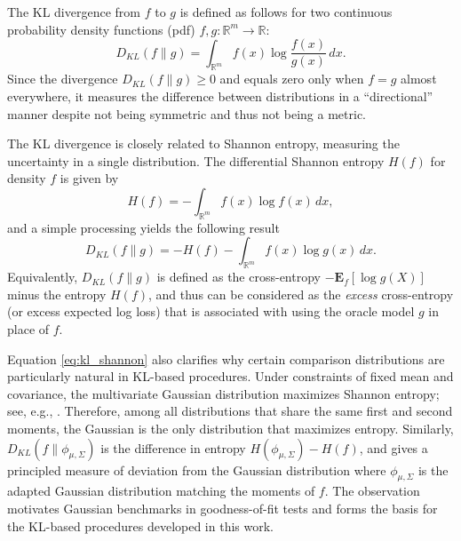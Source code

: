 \documentclass[12pt,a4paper]{article}
\newcommand{\E}{\mathbf {E}}
\theoremstyle{definition}
\theoremstyle{plain}
\begin{document}
The KL divergence from $f$ to $g$ is defined as follows for two continuous probability density functions (pdf) $f,g:\mathbb{R}^m \to
\mathbb{R}$:
\begin{equation}\label{eq:kl_divergence}
D_{KL}(f \| g) = \int_{\mathbb{R}^m} f(x) \log \frac{f(x)}{g(x)}\,dx.
\end{equation}
 Since the divergence $D_{KL}(f \| g)\geq 0$ and equals zero only when $f = g$ almost everywhere, it measures the difference between distributions in a “directional” manner despite not being symmetric and thus not being a metric.

The KL divergence is closely related to Shannon entropy, measuring the uncertainty in a single distribution. The differential Shannon entropy $H(f)$ \cite{shannon1948mathematical} for density $f$ is given by
\begin{equation}\label{eq:shannon_entropy}
H(f) = -\int_{\mathbb{R}^{m}} f(x) \log f(x)\,dx,
\end{equation}
and a simple processing yields the following result
\begin{equation}\label{eq:kl_shannon}
D_{KL}(f\|g) = -H(f) - \int_{\mathbb{R}^m} f(x)\log g(x)\,dx.
\end{equation}
Equivalently, $D_{KL}(f\|g)$ is defined as the cross-entropy $-\E_f[\log g(X)]$
minus the entropy $H(f)$, and thus can be considered as the \emph{excess} cross-entropy (or excess expected log loss) that is associated with using the oracle model $g$ in place of $f$.

Equation \eqref{eq:kl_shannon} also clarifies why certain comparison distributions are particularly natural in KL-based procedures.
Under constraints of fixed mean and covariance, the multivariate Gaussian distribution maximizes Shannon entropy; see, e.g., \cite{cover2006elements,Jaynes1957,kullback1997information,jaynes2003probability}. Therefore, among all distributions that share the same first and second moments, the Gaussian is the only distribution that maximizes entropy. Similarly,
$D_{KL}(f\|\phi_{{\mu},{{\Sigma}}})$ is the difference in entropy
$H(\phi_{{\mu},{{\Sigma}}})-H(f)$, and gives a principled measure of deviation from the Gaussian distribution where $\phi_{{\mu},{{\Sigma}}}$ is the adapted Gaussian distribution matching the moments of $f$. The observation motivates Gaussian benchmarks in goodness-of-fit tests and forms the basis for the KL-based procedures developed in this work.
\end{document}
